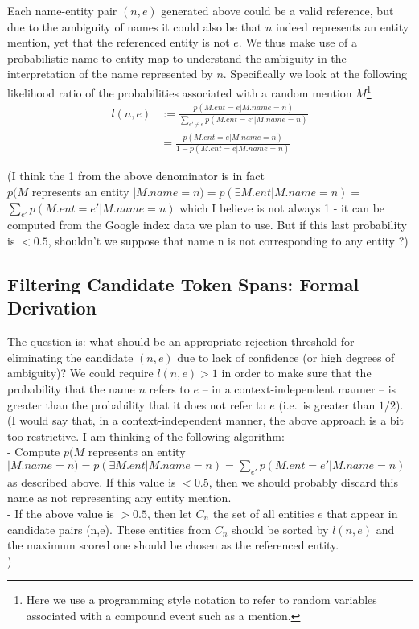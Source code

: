 \documentclass{article}
\begin{document}
Each name-entity pair $(n,e)$ generated above could be a valid reference, but due to the ambiguity of names it could also be that $n$ indeed represents an entity mention, yet that the referenced entity is not $e$. We thus make use of a probabilistic name-to-entity map to understand the ambiguity in the interpretation of the name represented by $n$. Specifically we look at the following likelihood ratio of the probabilities associated with a random mention $M$\footnote{Here we use a programming style notation to refer to random variables associated with a compound event such as a mention.}
\begin{align}
l(n,e) & := \frac{p(M.ent = e | M.name = n)}{\sum_{e' \neq e} p(M.ent = e' | M.name = n)}
\\ & = \frac{p(M.ent = e | M.name = n)}{1-p(M.ent = e | M.name = n)} \nonumber
\end{align}

{\color{blue} (I think the 1 from the above denominator is in fact \\ $p(M$ represents an entity $|M.name = n) = p(\exists M.ent | M.name=n) =$ \\ $ \sum\limits_{e'} p(M.ent =e' | M.name=n)$ which I believe is not always 1 - it can be computed from the Google index data we plan to use. But if this last probability is $<0.5$, shouldn't we suppose that name n is not corresponding to any entity ?)}

\subsection*{Filtering Candidate Token Spans: Formal Derivation} 

The question is: what should be an appropriate rejection threshold for eliminating the candidate $(n,e)$ due to lack of confidence (or high degrees of ambiguity)?  We could require $l(n,e) > 1$ in order to make sure that the probability that the name $n$ refers to $e$ -- in a context-independent manner -- is greater than the probability that it does not refer to $e$ (i.e.~is greater than $1/2$). \\
{\color{blue} (I would say that, in a context-independent manner, the above approach is a bit too restrictive. I am thinking of the following algorithm:\\
- Compute $p(M$ represents an entity $|M.name = n) = p(\exists M.ent | M.name=n) = \sum\limits_{e'} p(M.ent =e' | M.name=n)$ as described above. If this value is $< 0.5$, then we should probably discard this name as not representing any entity mention.\\
- If the above value is $> 0.5$, then let $C_n$ the set of all entities $e$ that appear in candidate pairs (n,e). These entities from $C_n$ should be sorted by $l(n,e)$ and the maximum scored one should be chosen as the referenced entity.\\
)} 
\end{document}
